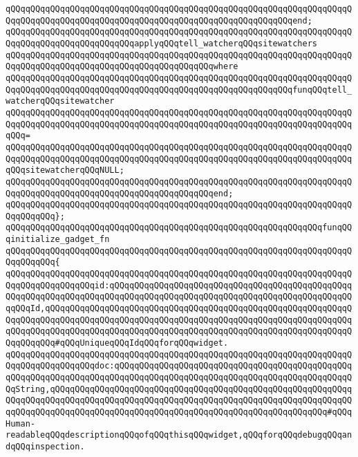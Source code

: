 \verb|qQQqqQQqqQQqqQQqqQQqqQQqqQQqqQQqqQQqqQQqqQQqqQQqqQQqqQQqqQQqqQQqqQQqqQQqqQQqqQQqqQQqqQQqqQQqqQQqqQQqqQQqqQQqqQQqqQQqqQQqqQQqqQQqend;|\newline
\newline
\verb|qQQqqQQqqQQqqQQqqQQqqQQqqQQqqQQqqQQqqQQqqQQqqQQqqQQqqQQqqQQqqQQqqQQqqQQqqQQqqQQqqQQqqQQqqQQqqQQqapplyqQQqtell_watcherqQQqsitewatchers|\newline
\verb|qQQqqQQqqQQqqQQqqQQqqQQqqQQqqQQqqQQqqQQqqQQqqQQqqQQqqQQqqQQqqQQqqQQqqQQqqQQqqQQqqQQqqQQqqQQqqQQqqQQqqQQqqQQqqQQqwhere|\newline
\verb|qQQqqQQqqQQqqQQqqQQqqQQqqQQqqQQqqQQqqQQqqQQqqQQqqQQqqQQqqQQqqQQqqQQqqQQqqQQqqQQqqQQqqQQqqQQqqQQqqQQqqQQqqQQqqQQqqQQqqQQqqQQqqQQqfunqQQqtell_watcherqQQqsitewatcher|\newline
\verb|qQQqqQQqqQQqqQQqqQQqqQQqqQQqqQQqqQQqqQQqqQQqqQQqqQQqqQQqqQQqqQQqqQQqqQQqqQQqqQQqqQQqqQQqqQQqqQQqqQQqqQQqqQQqqQQqqQQqqQQqqQQqqQQqqQQqqQQqqQQqqQQq=|\newline
\verb|qQQqqQQqqQQqqQQqqQQqqQQqqQQqqQQqqQQqqQQqqQQqqQQqqQQqqQQqqQQqqQQqqQQqqQQqqQQqqQQqqQQqqQQqqQQqqQQqqQQqqQQqqQQqqQQqqQQqqQQqqQQqqQQqqQQqqQQqqQQqqQQqsitewatcherqQQqNULL;|\newline
\verb|qQQqqQQqqQQqqQQqqQQqqQQqqQQqqQQqqQQqqQQqqQQqqQQqqQQqqQQqqQQqqQQqqQQqqQQqqQQqqQQqqQQqqQQqqQQqqQQqqQQqqQQqqQQqqQQqend;|\newline
\verb|qQQqqQQqqQQqqQQqqQQqqQQqqQQqqQQqqQQqqQQqqQQqqQQqqQQqqQQqqQQqqQQqqQQqqQQqqQQqqQQq};|\newline
\newline
\verb|qQQqqQQqqQQqqQQqqQQqqQQqqQQqqQQqqQQqqQQqqQQqqQQqqQQqqQQqqQQqqQQqfunqQQqinitialize_gadget_fn|\newline
\verb|qQQqqQQqqQQqqQQqqQQqqQQqqQQqqQQqqQQqqQQqqQQqqQQqqQQqqQQqqQQqqQQqqQQqqQQqqQQqqQQq{|\newline
\verb|qQQqqQQqqQQqqQQqqQQqqQQqqQQqqQQqqQQqqQQqqQQqqQQqqQQqqQQqqQQqqQQqqQQqqQQqqQQqqQQqqQQqqQQqid:qQQqqQQqqQQqqQQqqQQqqQQqqQQqqQQqqQQqqQQqqQQqqQQqqQQqqQQqqQQqqQQqqQQqqQQqqQQqqQQqqQQqqQQqqQQqqQQqqQQqqQQqqQQqqQQqqQQqqQQqqQQqId,qQQqqQQqqQQqqQQqqQQqqQQqqQQqqQQqqQQqqQQqqQQqqQQqqQQqqQQqqQQqqQQqqQQqqQQqqQQqqQQqqQQqqQQqqQQqqQQqqQQqqQQqqQQqqQQqqQQqqQQqqQQqqQQqqQQqqQQqqQQqqQQqqQQqqQQqqQQqqQQqqQQqqQQqqQQqqQQqqQQqqQQqqQQqqQQqqQQqqQQqqQQqqQQqqQQq#qQQqUniqueqQQqIdqQQqforqQQqwidget.|\newline
\verb|qQQqqQQqqQQqqQQqqQQqqQQqqQQqqQQqqQQqqQQqqQQqqQQqqQQqqQQqqQQqqQQqqQQqqQQqqQQqqQQqqQQqqQQqdoc:qQQqqQQqqQQqqQQqqQQqqQQqqQQqqQQqqQQqqQQqqQQqqQQqqQQqqQQqqQQqqQQqqQQqqQQqqQQqqQQqqQQqqQQqqQQqqQQqqQQqqQQqqQQqqQQqqQQqqQQqString,qQQqqQQqqQQqqQQqqQQqqQQqqQQqqQQqqQQqqQQqqQQqqQQqqQQqqQQqqQQqqQQqqQQqqQQqqQQqqQQqqQQqqQQqqQQqqQQqqQQqqQQqqQQqqQQqqQQqqQQqqQQqqQQqqQQqqQQqqQQqqQQqqQQqqQQqqQQqqQQqqQQqqQQqqQQqqQQqqQQqqQQqqQQqqQQqqQQq#qQQqHuman-readableqQQqdescriptionqQQqofqQQqthisqQQqwidget,qQQqforqQQqdebugqQQqandqQQqinspection.|\newline
